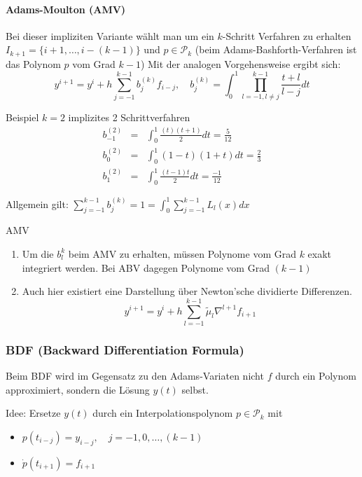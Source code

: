 \paragraph{Adams-Moulton (AMV)}
Bei dieser impliziten Variante wählt man um ein $k$-Schritt Verfahren zu erhalten $I_{k+1}=\{i+1,\ldots,i-(k-1)\}$ und $p\in \mathcal{P}_{k}$
(beim Adams-Bashforth-Verfahren ist das Polynom $p$ vom Grad $k-1$) Mit der analogen Vorgehensweise ergibt sich:
$$y^{i+1}=y^{i}+h\sum_{j=-1}^{k-1}b_{j}^{(k)}f_{i-j},\quad b_{j}^{(k)}=\int_{0}^{1}\prod_{l=-1,l\not =j}^{k-1}\frac{t+l}{l-j}dt$$

\begin{example}
	Beispiel $k=2$ implizites 2 Schrittverfahren
	\begin{eqnarray*}
		b_{-1}^{(2)}&=&\int_{0}^{1}\frac{(t)(t+1)}{2}dt=\frac{5}{12}\\
		b_{0}^{(2)}&=&\int_{0}^{1}(1-t)(1+t)dt=\frac{2}{3}\\
		b_{1}^{(2)}&=&\int_{0}^{1}\frac{(t-1)t}{2}dt=\frac{-1}{12}
	\end{eqnarray*}
\end{example}

Allgemein gilt: $\sum_{j=-1}^{k-1}b_{j}^{(k)}=1=\int_{0}^{1}\sum_{j=-1}^{k-1}L_{l}(x)dx$

\begin{remark} AMV
	\begin{enumerate}
		\item Um die $b_{l}^{k}$ beim AMV zu erhalten, müssen Polynome vom Grad $k$ exakt integriert werden. Bei ABV dagegen Polynome
		vom Grad $(k-1)$
		\item Auch hier existiert eine Darstellung über Newton'sche dividierte Differenzen.
		$$y^{i+1}=y^{i}+h\sum_{l=-1}^{k-1}\tilde\mu_{l}\nabla^{l+1}f_{i+1}$$
	\end{enumerate}
\end{remark}

\subsubsection{BDF (Backward Differentiation Formula)}
Beim BDF wird im Gegensatz zu den Adams-Variaten nicht $f$ durch ein Polynom approximiert, sondern die Lösung $y(t)$ selbst.

Idee: Ersetze $y(t)$ durch ein Interpolationspolynom $p\in \mathcal{P}_{k}$ mit
\begin{itemize}
	\item $p(t_{i-j})=y_{i-j},\quad j=-1,0,\ldots,(k-1)$
	\item $\dot p(t_{i+1}) =f_{i+1}$
\end{itemize}

